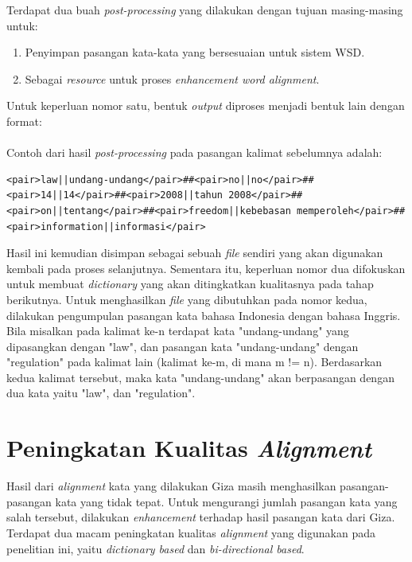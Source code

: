 Terdapat dua buah \textit{post-processing} yang dilakukan dengan tujuan masing-masing untuk:

\begin{enumerate}
	\item Penyimpan pasangan kata-kata yang bersesuaian untuk sistem WSD.
	\item Sebagai \textit{resource} untuk proses \textit{enhancement word alignment}.
\end{enumerate}


Untuk keperluan nomor satu, bentuk \textit{output} diproses menjadi bentuk lain dengan format:\\

\noindent{}\\


Contoh dari hasil \textit{post-processing} pada pasangan kalimat sebelumnya adalah:

\begin{lstlisting}[backgroundcolor = \color{white}]
<pair>law||undang-undang</pair>##<pair>no||no</pair>##<pair>14||14</pair>##<pair>2008||tahun 2008</pair>##<pair>on||tentang</pair>##<pair>freedom||kebebasan memperoleh</pair>##<pair>information||informasi</pair>
\end{lstlisting}

Hasil ini kemudian disimpan sebagai sebuah \textit{file} sendiri yang akan digunakan kembali pada proses selanjutnya. Sementara itu, keperluan nomor dua difokuskan untuk membuat \textit{dictionary} yang akan ditingkatkan kualitasnya pada tahap berikutnya. Untuk menghasilkan \textit{file} yang dibutuhkan pada nomor kedua, dilakukan pengumpulan pasangan kata bahasa Indonesia dengan bahasa Inggris. Bila misalkan pada kalimat ke-n terdapat kata "undang-undang" yang dipasangkan dengan "law", dan pasangan kata "undang-undang" dengan "regulation" pada kalimat lain (kalimat ke-m, di mana m != n). Berdasarkan kedua kalimat tersebut, maka kata "undang-undang" akan berpasangan dengan dua kata yaitu "law", dan "regulation".

\section{Peningkatan Kualitas \textit{Alignment}}

Hasil dari \textit{alignment} kata yang dilakukan Giza masih menghasilkan pasangan-pasangan kata yang tidak tepat. Untuk mengurangi jumlah pasangan kata yang salah tersebut, dilakukan \textit{enhancement} terhadap hasil pasangan kata dari Giza. Terdapat dua macam peningkatan kualitas \textit{alignment} yang digunakan pada penelitian ini, yaitu \textit{dictionary based} dan \textit{bi-directional based}.

